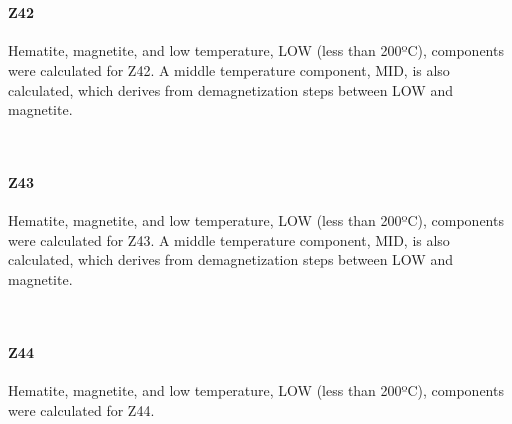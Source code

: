 \documentclass[11pt]{article}
\begin{document}
    \begin{center}
    \end{center}
    { \hspace*{\fill} \\}
    
    \paragraph{Z42}\label{z42}

    Hematite, magnetite, and low temperature, LOW (less than 200ºC),
components were calculated for Z42. A middle temperature component, MID,
is also calculated, which derives from demagnetization steps between LOW
and magnetite.



    \begin{center}
    \end{center}
    { \hspace*{\fill} \\}
    
    \paragraph{Z43}\label{z43}

    Hematite, magnetite, and low temperature, LOW (less than 200ºC),
components were calculated for Z43. A middle temperature component, MID,
is also calculated, which derives from demagnetization steps between LOW
and magnetite.



    \begin{center}
    \end{center}
    { \hspace*{\fill} \\}
    
    \paragraph{Z44}\label{z44}

    Hematite, magnetite, and low temperature, LOW (less than 200ºC),
components were calculated for Z44.
\end{document}
